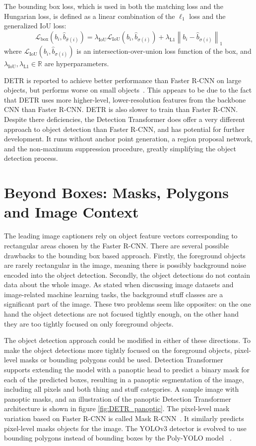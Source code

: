 \documentclass[english,twoside,openright]{HYgraduMLDS}
\begin{document}
The bounding box loss, which is used in both the matching loss and the Hungarian loss, is defined as a linear combination of the $\ell_1$ loss and the generalized IoU loss:
\begin{equation}
\mathcal{L}_{\text{box}}(b_i, \hat{b}_{\hat{\sigma}(i)}) = \lambda_\text{IoU} \mathcal{L}_{\text{IoU}}(b_i, \hat{b}_{\sigma(i)}) + \lambda_\text{L1} \left\lVert b_i - \hat{b}_{\sigma(i)}\right\rVert_1
\end{equation}
%
where $\mathcal{L}_{\text{IoU}}(b_i, \hat{b}_{\sigma(i)})$ is an intersection-over-union loss function of the box, and $\lambda_\text{IoU}, \lambda_\text{L1} \in \mathbb{R}$ are hyperparameters.

DETR is reported to achieve better performance than Faster R-CNN on large objects, but performs worse on small objects~\cite{DETR}. This appears to be due to the fact that DETR uses more higher-level, lower-resolution features from the backbone CNN than Faster R-CNN. DETR is also slower to train than Faster R-CNN. Despite there deficiencies, the Detection Transformer does offer a very different approach to object detection than Faster R-CNN, and has potential for further development. It runs without anchor point generation, a region proposal network, and the non-maximum suppression procedure, greatly simplifying the object detection process.

\section{Beyond Boxes: Masks, Polygons and Image Context}
\label{section:BeyondBoxes}
The leading image captioners rely on object feature vectors corresponding to rectangular areas chosen by the Faster R-CNN. There are several possible drawbacks to the bounding box based approach. Firstly, the foreground objects are rarely rectangular in the image, meaning there is possibly background noise encoded into the object detection. Secondly, the object detections do not contain data about the whole image. As stated when discussing image datasets and image-related machine learning tasks, the background stuff classes are a significant part of the image. These two problems seem like opposites: on the one hand the object detections are not focused tightly enough, on the other hand they are too tightly focused on only foreground objects.

The object detection approach could be modified in either of these directions. To make the object detections more tightly focused on the foreground objects, pixel-level masks or bounding polygons could be used. Detection Transformer~\cite{DETR} supports extending the model with a panoptic head to predict a binary mask for each of the predicted boxes, resulting in a panoptic segmentation of the image, including all pixels and both thing and stuff categories. A sample image with panoptic masks, and an illustration of the panoptic Detection Transformer architecture is shown in figure \ref{fig:DETR_panoptic}. The pixel-level mask variation based on Faster R-CNN is called Mask R-CNN~\cite{MaskRCNN}. It similarly predicts pixel-level masks objects for the image. The YOLOv3 detector is evolved to use bounding polygons instead of bounding boxes by the Poly-YOLO model ~\cite{PolyYOLO}.
\end{document}
